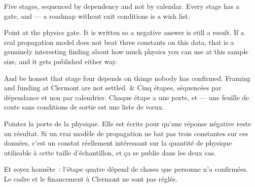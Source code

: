 \documentclass[10pt,a4paper]{article}
\begin{document}
\begin{say}
Five stages, sequenced by dependency and not by calendar. Every stage has a gate,
and  --- a roadmap without exit conditions is a
wish list.

Point at the physics gate. It is written so a negative answer is still a result.
If a real propagation model does not beat three constants on this data, that is a
genuinely interesting finding about how much physics you can use at this sample
size, and it gets published either way.

And be honest that stage four depends on things nobody has confirmed. Framing and
funding at Clermont are not settled. 
&
Cinq étapes, séquencées par dépendance et non par calendrier. Chaque étape a une
porte, et  --- une feuille de route sans
conditions de sortie est une liste de vœux.

Pointez la porte de la physique. Elle est écrite pour qu'une réponse négative reste
un résultat. Si un vrai modèle de propagation ne bat pas trois constantes sur ces
données, c'est un constat réellement intéressant sur la quantité de physique
utilisable à cette taille d'échantillon, et ça se publie dans les deux cas.

Et soyez honnête~: l'étape quatre dépend de choses que personne n'a confirmées. Le
cadre et le financement à Clermont ne sont pas réglés. 
\end{say}
\end{document}
